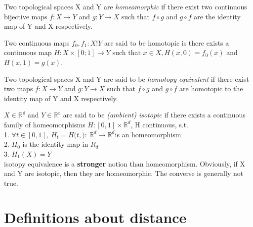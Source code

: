 \begin{definition}
Two topological spaces X and Y are \textit{homeomorphic} if there exist two continuous bijective maps $f : X \rightarrow
Y$ and $g : Y \rightarrow X$ such that $f \circ g$ and $g \circ f$ are the identity map of Y and X respectively.
\end{definition}

\begin{definition}
Two continuous maps $f_0, f_1 : X ! Y$ are said to be homotopic is there exists a continuous map $H : X \times [0; 1] \rightarrow Y$ such that $ x \in X, H(x, 0) = f_0(x)$ and $H(x, 1) = g(x)$.
\end{definition}

\begin{definition}
Two topological spaces X and Y are said to be \textit{homotopy equivalent} if there exist two maps $f : X \rightarrow Y$ and $g : Y \rightarrow X$ such that $f \circ g$ and $g \circ f$ are homotopic to the identity map of Y and X respectively.
\end{definition}

\begin{definition}
$X \in \mathbb{R^d}$ and $Y \in \mathbb{R^d}$ are said to be \textit{(ambient) isotopic} if there exists a continuous family of homeomorphisms $H:[0,1]\times \mathbb{R}^d$, H continuous, s.t.\\
1. $\forall t \in[0,1],\ H_t=H(t,\dot):\ \mathbb{R}^d \rightarrow \mathbb{R}^d$is an homeomorphism\\
2. $H_0$ is the identity map in $R_d$\\
3. $H_1(X) = Y$\\
isotopy equivalence is a \textbf{stronger} notion than homeomorphism. Obviously, if X and Y are isotopic, then they are homeomorphic. The converse is generally not true.
\end{definition}


\section{Definitions about distance}
